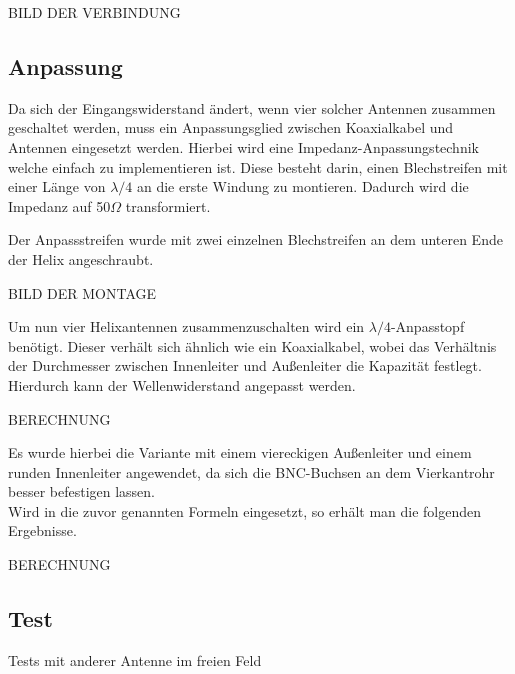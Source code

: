 BILD DER VERBINDUNG

\subsection{Anpassung}
Da sich der Eingangswiderstand ändert, wenn vier solcher Antennen zusammen geschaltet werden, muss ein Anpassungsglied zwischen Koaxialkabel und Antennen eingesetzt werden. Hierbei wird eine Impedanz-Anpassungstechnik welche einfach zu implementieren ist. Diese besteht darin, einen Blechstreifen mit einer Länge von $\lambda/4$ an die erste Windung zu montieren. Dadurch wird die Impedanz auf 50$\Omega$ transformiert.

Der Anpassstreifen wurde mit zwei einzelnen Blechstreifen an dem unteren Ende der Helix angeschraubt.

BILD DER MONTAGE

Um nun vier Helixantennen zusammenzuschalten wird ein $\lambda/4$-Anpasstopf benötigt. Dieser verhält sich ähnlich wie ein Koaxialkabel, wobei das Verhältnis der Durchmesser zwischen Innenleiter und Außenleiter die Kapazität festlegt. Hierdurch kann der Wellenwiderstand angepasst werden.


BERECHNUNG

\cite{admin_lambda4_2016}

Es wurde hierbei die Variante mit einem viereckigen Außenleiter und einem runden Innenleiter angewendet, da sich die BNC-Buchsen an dem Vierkantrohr besser befestigen lassen.\\
Wird in die zuvor genannten Formeln eingesetzt, so erhält man die folgenden Ergebnisse.

BERECHNUNG



\subsection{Test}

Tests mit anderer Antenne im freien Feld